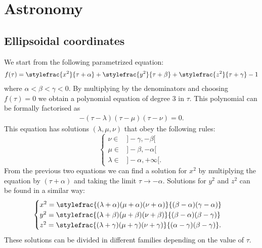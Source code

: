 \chapter{Astronomy}

\section{Ellipsoidal coordinates}

    We start from the following parametrized equation:
    \begin{gather}\index{coordinate!ellipsoidal}
        \label{astronomy:ellipsoidal_defining_function}
        f(\tau) = \stylefrac{x^2}{\tau + \alpha} + \stylefrac{y^2}{\tau + \beta} + \stylefrac{z^2}{\tau + \gamma} - 1
    \end{gather}
    where $\alpha<\beta<\gamma<0$. By multiplying by the denominators and choosing $f(\tau) = 0$ we obtain a polynomial equation of degree 3 in $\tau$. This polynomial can be formally factorised as
    \begin{gather}
        -(\tau-\lambda)(\tau-\mu)(\tau-\nu) = 0.
    \end{gather}
    This equation has solutions $(\lambda, \mu, \nu)$ that obey the following rules:
    \[
        \begin{cases}
            \nu\in&]-\gamma, -\beta[\\
            \mu\in&]-\beta, -\alpha[\\
            \lambda\in&]-\alpha, +\infty[.
        \end{cases}
    \]
    From the previous two equations we can find a solution for $x^2$ by multiplying the equation by $(\tau+\alpha)$ and taking the limit $\tau\rightarrow-\alpha$. Solutions for $y^2$ and $z^2$ can be found in a similar way:
    \begin{gather}
        \label{astronomy:ellipsoidal_coordinates}
        \begin{cases}
            x^2 = \stylefrac{(\lambda + \alpha)(\mu + \alpha)(\nu + \alpha)}{(\beta - \alpha)(\gamma - \alpha)}&\\
            y^2 = \stylefrac{(\lambda + \beta)(\mu + \beta)(\nu + \beta)}{(\beta - \alpha)(\beta - \gamma)}&\\
            z^2 = \stylefrac{(\lambda + \gamma)(\mu + \gamma)(\nu + \gamma)}{(\alpha - \gamma)(\beta - \gamma)}.&
        \end{cases}
    \end{gather}
    These solutions can be divided in different families depending on the value of $\tau$.

